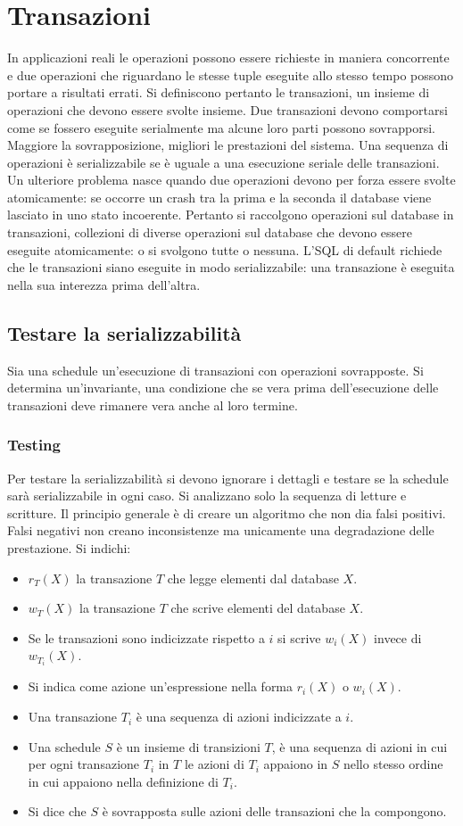 \chapter{Transazioni}
In applicazioni reali le operazioni possono essere richieste in maniera concorrente e due operazioni che riguardano le stesse tuple eseguite allo stesso tempo possono portare a risultati errati. Si definiscono 
pertanto le transazioni, un insieme di operazioni che devono essere svolte insieme. Due transazioni devono comportarsi come se fossero eseguite serialmente ma alcune loro parti possono sovrapporsi. Maggiore
la sovrapposizione, migliori le prestazioni del sistema. Una sequenza di operazioni \`e serializzabile se \`e uguale a una esecuzione seriale delle transazioni. Un ulteriore problema nasce quando due operazioni
devono per forza essere svolte atomicamente: se occorre un crash tra la prima e la seconda il database viene lasciato in uno stato incoerente. Pertanto si raccolgono operazioni sul database in transazioni, 
collezioni di diverse operazioni sul database che devono essere eseguite atomicamente: o si svolgono tutte o nessuna. L'SQL di default richiede che le transazioni siano eseguite in modo serializzabile: una 
transazione \`e eseguita nella sua interezza prima dell'altra. 
\section{Testare la serializzabilit\`a}
Sia una schedule un'esecuzione di transazioni con operazioni sovrapposte. Si determina un'invariante, una condizione che se vera prima dell'esecuzione delle transazioni deve rimanere vera anche al loro termine.
\subsection{Testing}
Per testare la serializzabilit\`a si devono ignorare i dettagli e testare se la schedule sar\`a serializzabile in ogni caso. Si analizzano solo la sequenza di letture e scritture. Il principio generale \`e di creare un
algoritmo che non dia falsi positivi. Falsi negativi non creano inconsistenze ma unicamente una degradazione delle prestazione. Si indichi:
\begin{itemize}
\item $r_T(X)$ la transazione $T$ che legge elementi dal database $X$.
\item $w_T(X)$ la transazione $T$ che scrive elementi del database $X$.
\item Se le transazioni sono indicizzate rispetto a $i$ si scrive $w_i(X)$ invece di $w_{T_i}(X)$.
\item Si indica come azione un'espressione nella forma $r_i(X)$ o $w_i(X)$. 
\item Una transazione $T_i$ \`e una sequenza di azioni indicizzate a $i$.
\item Una schedule $S$ \`e un insieme di transizioni $T$, \`e una sequenza di azioni in cui per ogni transazione $T_i$ in $T$ le azioni di $T_i$ appaiono in $S$ nello stesso ordine in cui appaiono nella definizione
di $T_i$.
\item Si dice che $S$ \`e sovrapposta sulle azioni delle transazioni che la compongono.
\end{itemize}
